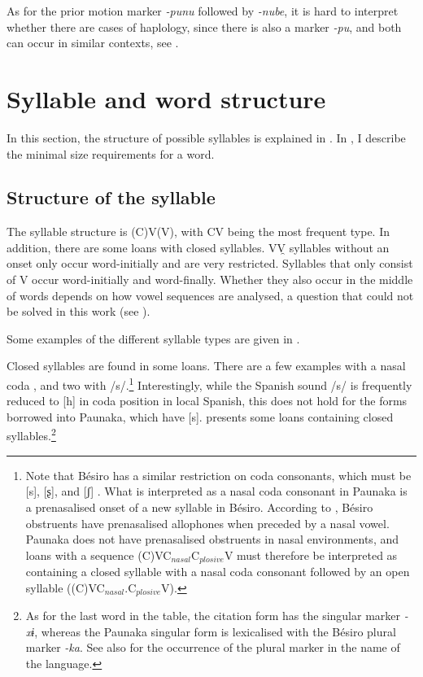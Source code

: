 As for the prior motion marker \textit{-punu} followed by \textit{-nube}, it is hard to interpret whether there are cases of haplology, since there is also a  marker \textit{-pu}, and both can occur in similar contexts, see .

\section{Syllable and word structure} \label{SyllableStructure}

In this section, the structure of possible syllables is explained in . In , I describe the minimal size requirements for a word.

\subsection{Structure of the syllable}\label{sec:SyllableStructure_subsection}
The syllable structure is {(}C)V(V), with CV being the most frequent type. In addition, there are some loans with closed syllables. VV̯ syllables without an onset only occur word-initially and are very restricted. Syllables that only consist of V occur word-initially and word-finally. Whether they also occur in the middle of words depends on how vowel sequences are analysed, a question that could not be solved in this work (see ).

\largerpage
Some examples of the different syllable types are given in . 




Closed syllables are found in some loans. There are a few examples with a nasal coda , and two with /s/.\footnote{Note that Bésiro has a similar restriction on coda consonants, which must be [s], [ʂ], and [ʃ] \citep[cf.][53]{Sans2010}. What is interpreted as a nasal coda consonant in Paunaka is a prenasalised onset of a new syllable in Bésiro. According to \citet[93]{Sans2010}, Bésiro obstruents have prenasalised allophones when preceded by a nasal vowel. Paunaka does not have prenasalised obstruents in nasal environments, and loans with a sequence {(}C)VC$_{nasal}$C$_{plosive}$V must therefore be interpreted as containing a closed syllable with a nasal coda consonant followed by an open syllable ({(}C)VC$_{nasal}$.C$_{plosive}$V).} Interestingly, while the Spanish sound /s/ is frequently reduced to [h] in coda position in local Spanish, this does not hold for the forms borrowed into Paunaka, which have [s].  presents some loans containing closed syllables.\footnote{As for the last word in the table, the  citation form has the singular marker \textit{-xɨ}, whereas the Paunaka singular form is lexicalised with the Bésiro plural marker \textit{-ka}. See also  for the occurrence of the plural marker in the name of the language.}\clearpage

